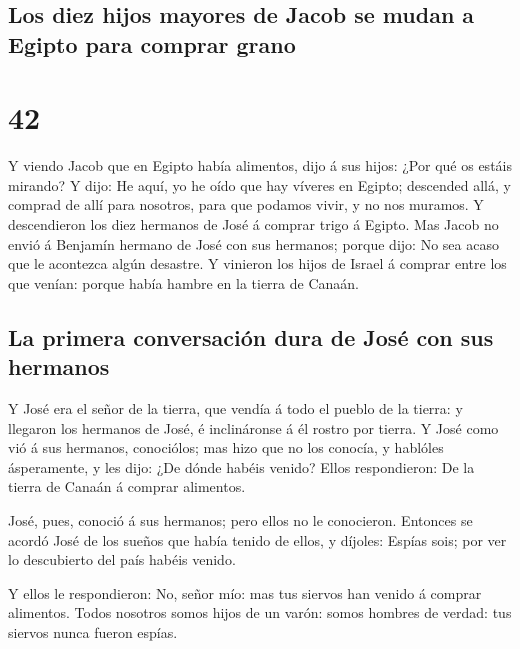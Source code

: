 \hypertarget{los-diez-hijos-mayores-de-jacob-se-mudan-a-egipto-para-comprar-grano}{%
\subsection{Los diez hijos mayores de Jacob se mudan a Egipto para
comprar
grano}\label{los-diez-hijos-mayores-de-jacob-se-mudan-a-egipto-para-comprar-grano}}

\hypertarget{section-41}{%
\section{42}\label{section-41}}

 Y viendo Jacob que en Egipto había alimentos, dijo á sus
hijos: ¿Por qué os estáis mirando?  Y dijo: He aquí, yo he
oído que hay víveres en Egipto; descended allá, y comprad de allí para
nosotros, para que podamos vivir, y no nos muramos.  Y
descendieron los diez hermanos de José á comprar trigo á Egipto.
 Mas Jacob no envió á Benjamín hermano de José con sus
hermanos; porque dijo: No sea acaso que le acontezca algún desastre.
 Y vinieron los hijos de Israel á comprar entre los que
venían: porque había hambre en la tierra de Canaán.

\hypertarget{la-primera-conversaciuxf3n-dura-de-josuxe9-con-sus-hermanos}{%
\subsection{La primera conversación dura de José con sus
hermanos}\label{la-primera-conversaciuxf3n-dura-de-josuxe9-con-sus-hermanos}}

 Y José era el señor de la tierra, que vendía á todo el
pueblo de la tierra: y llegaron los hermanos de José, é inclináronse á
él rostro por tierra.  Y José como vió á sus hermanos,
conociólos; mas hizo que no los conocía, y hablóles ásperamente, y les
dijo: ¿De dónde habéis venido? Ellos respondieron: De la tierra de
Canaán á comprar alimentos.

 José, pues, conoció á sus hermanos; pero ellos no le
conocieron.  Entonces se acordó José de los sueños que había
tenido de ellos, y díjoles: Espías sois; por ver lo descubierto del país
habéis venido.

 Y ellos le respondieron: No, señor mío: mas tus siervos
han venido á comprar alimentos.  Todos nosotros somos hijos
de un varón: somos hombres de verdad: tus siervos nunca fueron espías.

